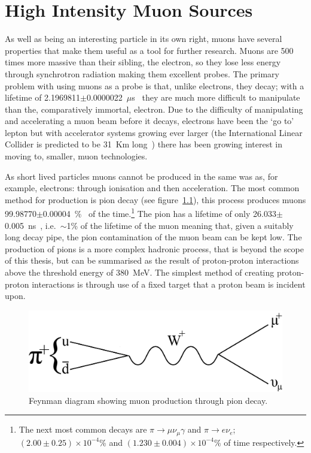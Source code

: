 \chapter{High Intensity Muon Sources} %
\label{cha:high_intensity_muon_sources}
As well as being an interesting particle in its own right, muons have several properties that make them useful as a tool for further research. Muons are 500 times more massive than their sibling, the electron, so they lose less energy through synchrotron radiation making them excellent probes. The primary problem with using muons as a probe is that, unlike electrons, they decay; with a lifetime of 2.1969811\( \pm \)0.0000022~\( \mu \)s~\cite{PDG for muons} they are much more difficult to manipulate than the, comparatively immortal, electron. Due to the difficulty of manipulating and accelerating a muon beam before it decays, electrons have been the `go to' lepton but with accelerator systems growing ever larger (the International Linear Collider is predicted to be 31~Km long~\cite{International Linear Collider ref}) there has been growing interest in moving to, smaller, muon technologies. 

As short lived particles muons cannot be produced in the same was as, for example, electrons: through ionisation and then acceleration. The most common method for production is pion decay (see figure~\ref{fig:pion_decay_feyman}), this process produces muons 99.98770$\pm$0.00004~\%~\cite{PDG CITATION mu lifetime} of the time.\footnote{The next most common decays are \( \pi\rightarrow\mu\nu_{\mu}\gamma \) and \( \pi\rightarrow e \nu_e \); \( (2.00\pm0.25)\times10^{-4} \)\% and \( (1.230\pm0.004)\times10^{-4} \)\% of time respectively.} The pion has a lifetime of only 26.033\(\pm\)0.005~ns~\cite{PDG for pions}, i.e.\ \( \sim \)1\% of the lifetime of the muon meaning that, given a suitably long decay pipe, the pion contamination of the muon beam can be kept low. The production of pions is a more complex hadronic process, that is beyond the scope of this thesis, but can be summarised as the result of proton-proton interactions above the threshold energy of 380~MeV. The simplest method of creating proton-proton interactions is through use of a fixed target that a proton beam is incident upon.

\begin{figure}[hptb]
  \centering  
    \includegraphics[scale=0.8]{images/pion_decay_feyman.png}
  \caption{Feynman diagram showing muon production through pion decay.}
  \label{fig:pion_decay_feyman}
\end{figure}

